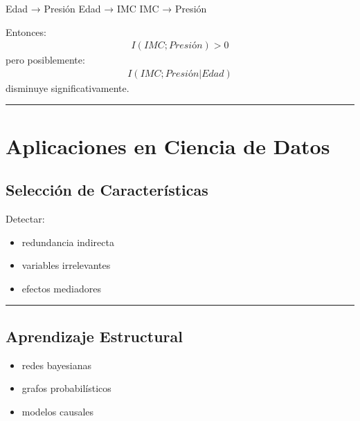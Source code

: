 \documentclass[letterpaper,10pt,english]{jupyterBook}
\begin{document}
\sphinxAtStartPar
Edad → Presión
Edad → IMC
IMC → Presión

\sphinxAtStartPar
Entonces:
\begin{equation*}
\begin{split}
I(IMC;Presión)>0
\end{split}
\end{equation*}
\sphinxAtStartPar
pero posiblemente:
\begin{equation*}
\begin{split}
I(IMC;Presión|Edad)
\end{split}
\end{equation*}
\sphinxAtStartPar
disminuye significativamente.


\bigskip\hrule\bigskip



\section{Aplicaciones en Ciencia de Datos}
\label{\detokenize{03_multivariate_models/conditional_mi:aplicaciones-en-ciencia-de-datos}}

\subsection{Selección de Características}
\label{\detokenize{03_multivariate_models/conditional_mi:seleccion-de-caracteristicas}}
\sphinxAtStartPar
Detectar:
\begin{itemize}
\item {} 
\sphinxAtStartPar
redundancia indirecta

\item {} 
\sphinxAtStartPar
variables irrelevantes

\item {} 
\sphinxAtStartPar
efectos mediadores

\end{itemize}


\bigskip\hrule\bigskip



\subsection{Aprendizaje Estructural}
\label{\detokenize{03_multivariate_models/conditional_mi:aprendizaje-estructural}}\begin{itemize}
\item {} 
\sphinxAtStartPar
redes bayesianas

\item {} 
\sphinxAtStartPar
grafos probabilísticos

\item {} 
\sphinxAtStartPar
modelos causales

\end{itemize}
\end{document}
